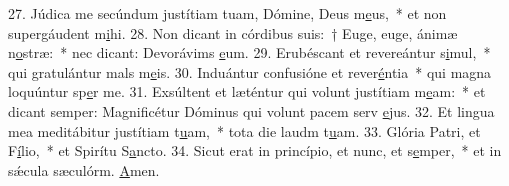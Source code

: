27. Júdica me secúndum justítiam tuam, Dómine, Deus m\uline{e}us,~* et non supergáudent m\uline{i}hi.
28. Non dicant in córdibus suis:~† Euge, euge, ánimæ n\uline{o}stræ:~* nec dicant: Devorávims \uline{e}um.
29. Erubéscant et revereántur s\uline{i}mul,~* qui gratulántur mals m\uline{e}is.
30. Induántur confusióne et rever\uline{é}ntia~* qui magna loquúntur sp\uline{e}r me.
31. Exsúltent et læténtur qui volunt justítiam m\uline{e}am:~* et dicant semper: Magnificétur Dóminus qui volunt pacem serv \uline{e}jus.
32. Et lingua mea meditábitur justítiam t\uline{u}am,~* tota die laudm t\uline{u}am.
33. Glória Patri, et F\uline{í}lio,~* et Spirítu S\uline{a}ncto.
34. Sicut erat in princípio, et nunc, et s\uline{e}mper,~* et in sǽcula sæculórm. \uline{A}men.
